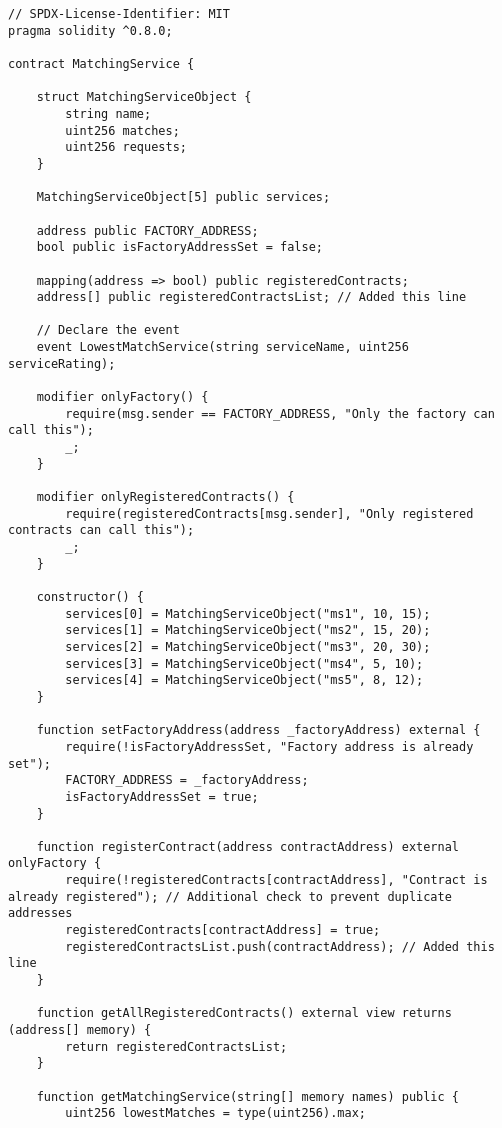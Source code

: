 \begin{lstlisting}
// SPDX-License-Identifier: MIT
pragma solidity ^0.8.0;

contract MatchingService {

    struct MatchingServiceObject {
        string name;
        uint256 matches;
        uint256 requests;
    }

    MatchingServiceObject[5] public services;

    address public FACTORY_ADDRESS;
    bool public isFactoryAddressSet = false;

    mapping(address => bool) public registeredContracts;
    address[] public registeredContractsList; // Added this line

    // Declare the event
    event LowestMatchService(string serviceName, uint256 serviceRating);

    modifier onlyFactory() {
        require(msg.sender == FACTORY_ADDRESS, "Only the factory can call this");
        _;
    }

    modifier onlyRegisteredContracts() {
        require(registeredContracts[msg.sender], "Only registered contracts can call this");
        _;
    }

    constructor() {
        services[0] = MatchingServiceObject("ms1", 10, 15);
        services[1] = MatchingServiceObject("ms2", 15, 20);
        services[2] = MatchingServiceObject("ms3", 20, 30);
        services[3] = MatchingServiceObject("ms4", 5, 10);
        services[4] = MatchingServiceObject("ms5", 8, 12);
    }

    function setFactoryAddress(address _factoryAddress) external {
        require(!isFactoryAddressSet, "Factory address is already set");
        FACTORY_ADDRESS = _factoryAddress;
        isFactoryAddressSet = true;
    }

    function registerContract(address contractAddress) external onlyFactory {
        require(!registeredContracts[contractAddress], "Contract is already registered"); // Additional check to prevent duplicate addresses
        registeredContracts[contractAddress] = true;
        registeredContractsList.push(contractAddress); // Added this line
    }

    function getAllRegisteredContracts() external view returns (address[] memory) {
        return registeredContractsList;
    }

    function getMatchingService(string[] memory names) public {
        uint256 lowestMatches = type(uint256).max;


\end{lstlisting}
